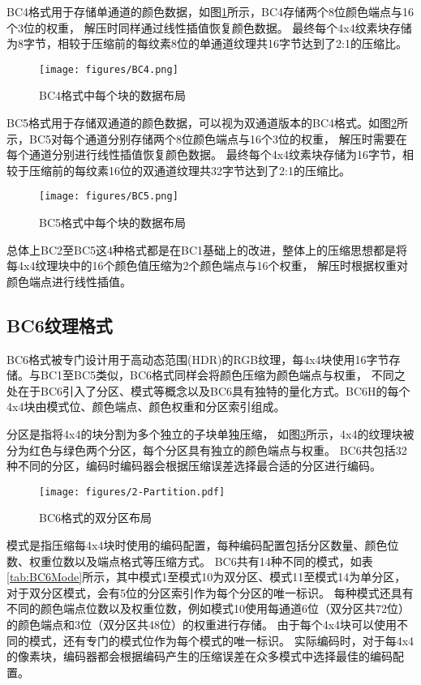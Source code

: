 BC4格式用于存储单通道的颜色数据，如图\ref{fig:BC4}所示，BC4存储两个8位颜色端点与16个3位的权重，
解压时同样通过线性插值恢复颜色数据。
最终每个4x4纹素块存储为8字节，相较于压缩前的每纹素8位的单通道纹理共16字节达到了2:1的压缩比。

\begin{figure}[htbp]
    \centering
    \texttt{[image: figures/BC4.png]}
    \caption{BC4格式中每个块的数据布局\cite{BC1-5}}
    \label{fig:BC4}
\end{figure}

BC5格式用于存储双通道的颜色数据，可以视为双通道版本的BC4格式。如图\ref{fig:BC5}所示，BC5对每个通道分别存储两个8位颜色端点与16个3位的权重，
解压时需要在每个通道分别进行线性插值恢复颜色数据。
最终每个4x4纹素块存储为16字节，相较于压缩前的每纹素16位的双通道纹理共32字节达到了2:1的压缩比。

\begin{figure}[htbp]
    \centering
    \texttt{[image: figures/BC5.png]}
    \caption{BC5格式中每个块的数据布局\cite{BC1-5}}
    \label{fig:BC5}
\end{figure}

总体上BC2至BC5这4种格式都是在BC1基础上的改进，整体上的压缩思想都是将每4x4纹理块中的16个颜色值压缩为2个颜色端点与16个权重，
解压时根据权重对颜色端点进行线性插值。

\subsection{BC6纹理格式}

BC6格式被专门设计用于高动态范围(HDR)的RGB纹理，每4x4块使用16字节存储。与BC1至BC5类似，BC6格式同样会将颜色压缩为颜色端点与权重，
不同之处在于BC6引入了分区、模式等概念以及BC6具有独特的量化方式。BC6H的每个4x4块由模式位、颜色端点、颜色权重和分区索引组成。

分区是指将4x4的块分割为多个独立的子块单独压缩，
如图\ref{fig:2-Partition}所示，4x4的纹理块被分为红色与绿色两个分区，每个分区具有独立的颜色端点与权重。
BC6共包括32种不同的分区，编码时编码器会根据压缩误差选择最合适的分区进行编码。

\begin{figure}[htbp]
    \centering
    \texttt{[image: figures/2-Partition.pdf]}
    \caption{BC6格式的双分区布局\cite{ASTC}}
    \label{fig:2-Partition}
\end{figure}

模式是指压缩每4x4块时使用的编码配置，每种编码配置包括分区数量、颜色位数、权重位数以及端点格式等压缩方式。
BC6共有14种不同的模式，如表\ref{tab:BC6Mode}所示，其中模式1至模式10为双分区、模式11至模式14为单分区，
对于双分区模式，会有5位的分区索引作为每个分区的唯一标识。
每种模式还具有不同的颜色端点位数以及权重位数，例如模式10使用每通道6位（双分区共72位）的颜色端点和3位（双分区共48位）的权重进行存储。
由于每个4x4块可以使用不同的模式，还有专门的模式位作为每个模式的唯一标识。
实际编码时，对于每4x4的像素块，编码器都会根据编码产生的压缩误差在众多模式中选择最佳的编码配置。

